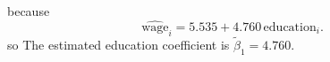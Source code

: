 because
\[
\widehat{\mathrm{wage}}_i = 5.535 + 4.760\,\mathrm{education}_i.
\]
so The estimated education coefficient is $\tilde{\beta}_1=4.760$.
